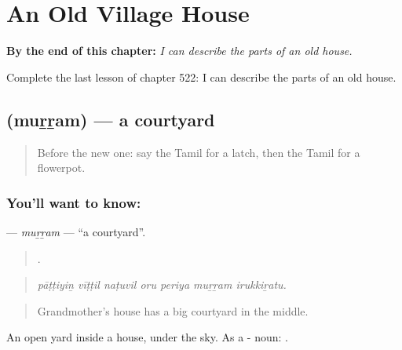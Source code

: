 
\chapter{An Old Village House}
\label{ch:ta-an-old-village-house}

\begin{chapteropening}
\textbf{By the end of this chapter:} \emph{I can describe the parts of an old house.}

Complete the last lesson of chapter 522: I can describe the parts of an old house.
\end{chapteropening}

\section[\texorpdfstring{\ta{முற்றம்} (muṟṟam)}{முற்றம் (muṟṟam)}]{ (muṟṟam) — a courtyard}

\label{lesson:TA-C522-murram}



\begin{quote}
Before the new one: say the Tamil for a latch, then the Tamil for a flowerpot.
\end{quote}

\subsection*{You'll want to know: }
\textbf{} — \emph{muṟṟam} — \textquotedblleft{}a courtyard\textquotedblright{}.

\begin{quote}
      .
\end{quote}

\begin{quote}
\emph{pāṭṭiyiṉ vīṭṭil naṭuvil oru periya muṟṟam irukkiṟatu.}
\end{quote}

\begin{quote}
Grandmother's house has a big courtyard in the middle.
\end{quote}

An open yard inside a house, under the sky. As a - noun: .

